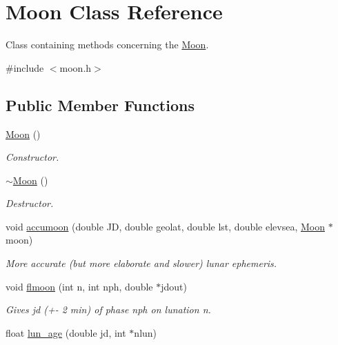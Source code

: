 \hypertarget{class_moon}{\section{Moon Class Reference}
\label{class_moon}
}


Class containing methods concerning the \hyperlink{class_moon}{Moon}.  




{\ttfamily \#include $<$moon.\-h$>$}

\subsection*{Public Member Functions}
\begin{DoxyCompactItemize}
\item 
\hypertarget{class_moon_a0b619a672127db3b5e7fbabd54b2012e}{\hyperlink{class_moon_a0b619a672127db3b5e7fbabd54b2012e}{Moon} ()}\label{class_moon_a0b619a672127db3b5e7fbabd54b2012e}

\begin{DoxyCompactList}\small\item\em Constructor. \end{DoxyCompactList}\item 
\hypertarget{class_moon_a3c2a0d46f278ee7ecf924c4a31da15f1}{\hyperlink{class_moon_a3c2a0d46f278ee7ecf924c4a31da15f1}{$\sim$\-Moon} ()}\label{class_moon_a3c2a0d46f278ee7ecf924c4a31da15f1}

\begin{DoxyCompactList}\small\item\em Destructor. \end{DoxyCompactList}\item 
void \hyperlink{class_moon_af52eace92172185489e8b136f8cba22b}{accumoon} (double J\-D, double geolat, double lst, double elevsea, \hyperlink{class_moon}{Moon} $\ast$moon)
\begin{DoxyCompactList}\small\item\em More accurate (but more elaborate and slower) lunar ephemeris. \end{DoxyCompactList}\item 
void \hyperlink{class_moon_a15747e93b49b698caad2d35873bfe51b}{flmoon} (int n, int nph, double $\ast$jdout)
\begin{DoxyCompactList}\small\item\em Gives jd (+-\/ 2 min) of phase nph on lunation n. \end{DoxyCompactList}\item 
\hypertarget{class_moon_a68f0b301a47960db9aae480bff8becf8}{float \hyperlink{class_moon_a68f0b301a47960db9aae480bff8becf8}{lun\-\_\-age} (double jd, int $\ast$nlun)}\label{class_moon_a68f0b301a47960db9aae480bff8becf8}


\end{DoxyCompactItemize}
